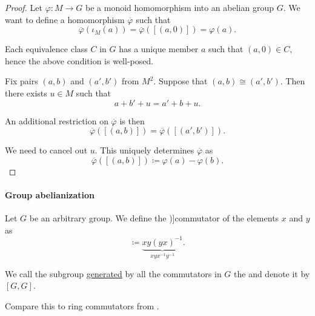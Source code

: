 \begin{proof}
  Let \( \varphi: M \to G \) be a monoid homomorphism into an abelian group \( G \). We want to define a homomorphism \( \overline{\varphi} \) such that
  \begin{equation*}
    \overline{\varphi}(\iota_M(a)) = \overline{\varphi}([(a, 0)]) = \varphi(a).
  \end{equation*}

  Each equivalence class \( C \) in \( G \) has a unique member \( a \) such that \( (a, 0) \in C \), hence the above condition is well-posed.

  Fix pairs \( (a, b) \) and \( (a', b') \) from \( M^2 \). Suppose that \( (a, b) \cong (a', b') \). Then there exists \( u \in M \) such that
  \begin{equation*}
    a + b' + u = a' + b + u.
  \end{equation*}

  An additional restriction on \( \overline{\varphi} \) is then
  \begin{equation*}
    \overline{\varphi}([(a, b)])
    =
    \overline{\varphi}([(a', b')]).
  \end{equation*}

  We need to cancel out \( u \). This uniquely determines \( \overline{\varphi} \) as
  \begin{equation*}
    \overline{\varphi}([(a, b)]) \coloneqq \varphi(a) - \varphi(b).
  \end{equation*}
\end{proof}

\paragraph{Group abelianization}

\begin{definition}\label{def:group_commutator}
  Let \( G \) be an arbitrary group. We define the \term[ru=коммутант (\cite[104]{Мальцев1970})]{commutator} of the elements \( x \) and \( y \) as
  \begin{equation*}
    [x, y] \coloneqq \underbrace{xy(yx)^{-1}}_{xyx^{-1}y^{-1}}.
  \end{equation*}

  We call the subgroup \hyperref[def:group/submodel]{generated} by all the commutators in \( G \) the  and denote it by \( [G, G] \).
\end{definition}
\begin{comments}
  \item Compare this to ring commutators from .
\end{comments}

